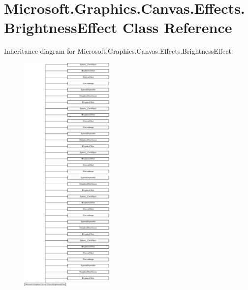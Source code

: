 \hypertarget{class_microsoft_1_1_graphics_1_1_canvas_1_1_effects_1_1_brightness_effect}{}\section{Microsoft.\+Graphics.\+Canvas.\+Effects.\+Brightness\+Effect Class Reference}
\label{class_microsoft_1_1_graphics_1_1_canvas_1_1_effects_1_1_brightness_effect}
Inheritance diagram for Microsoft.\+Graphics.\+Canvas.\+Effects.\+Brightness\+Effect\+:\begin{figure}[H]
\begin{center}
\leavevmode
\includegraphics[height=12.000000cm]{class_microsoft_1_1_graphics_1_1_canvas_1_1_effects_1_1_brightness_effect}
\end{center}
\end{figure}
